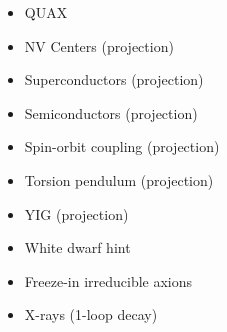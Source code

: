 \documentclass[8pt,twocolumn]{extarticle}
\begin{document}
\begin{mdframed}
\begin{itemize}
    \item QUAX~\cite{Crescini:2018qrz,QUAX:2020adt}
    	\item NV Centers (projection)~\cite{Chigusa:2023hms}
    	\item Superconductors (projection)~\cite{Hochberg:2016ajh}
  	\item Semiconductors (projection)~\cite{Hochberg:2016sqx}
  	\item Spin-orbit coupling (projection)~\cite{Chen:2022pyd}
  	\item Torsion pendulum (projection)~\cite{Gm:2017ivz}
  	  	\item YIG (projection)~\cite{Chigusa:2020gfs}
  	\item White dwarf hint~\cite{Giannotti:2017hny}
  	\item Freeze-in irreducible axions~\cite{Langhoff:2022bij}
  	\item X-rays (1-loop decay)~\cite{Ferreira:2022egk}
\end{itemize}
\end{mdframed}
\end{document}
